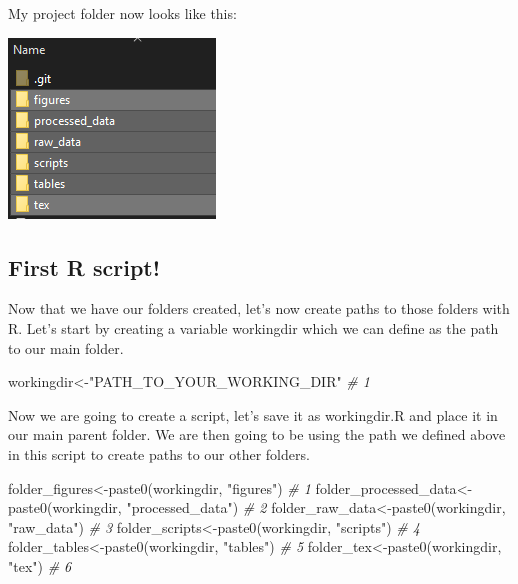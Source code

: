 \documentclass[
]{book}
\newenvironment{Shaded}{\begin{snugshade}}{\end{snugshade}}
\newcommand{\CommentTok}[1]{\textcolor[rgb]{0.56,0.35,0.01}{\textit{#1}}}
\newcommand{\FunctionTok}[1]{\textcolor[rgb]{0.00,0.00,0.00}{#1}}
\newcommand{\NormalTok}[1]{#1}
\newcommand{\OtherTok}[1]{\textcolor[rgb]{0.56,0.35,0.01}{#1}}
\newcommand{\StringTok}[1]{\textcolor[rgb]{0.31,0.60,0.02}{#1}}
\begin{document}
My project folder now looks like this:

\begin{center}\includegraphics[width=0.3\linewidth]{img/folders} \end{center}

\hypertarget{first-r-script}{%
\subsection{First R script!}\label{first-r-script}}

Now that we have our folders created, let's now create paths to those folders with R. Let's start by creating a variable workingdir which we can define as the path to our main folder.

\begin{Shaded}
\begin{Highlighting}[]
\NormalTok{workingdir}\OtherTok{\textless{}{-}}\StringTok{"PATH\_TO\_YOUR\_WORKING\_DIR"}  \CommentTok{\# 1}
\end{Highlighting}
\end{Shaded}

Now we are going to create a script, let's save it as workingdir.R and place it in our main parent folder. We are then going to be using the path we defined above in this script to create paths to our other folders.

\begin{Shaded}
\begin{Highlighting}[]
\NormalTok{folder\_figures}\OtherTok{\textless{}{-}}\FunctionTok{paste0}\NormalTok{(workingdir, }\StringTok{"figures"}\NormalTok{)                }\CommentTok{\# 1}
\NormalTok{folder\_processed\_data}\OtherTok{\textless{}{-}}\FunctionTok{paste0}\NormalTok{(workingdir, }\StringTok{"processed\_data"}\NormalTok{)  }\CommentTok{\# 2}
\NormalTok{folder\_raw\_data}\OtherTok{\textless{}{-}}\FunctionTok{paste0}\NormalTok{(workingdir, }\StringTok{"raw\_data"}\NormalTok{)              }\CommentTok{\# 3}
\NormalTok{folder\_scripts}\OtherTok{\textless{}{-}}\FunctionTok{paste0}\NormalTok{(workingdir, }\StringTok{"scripts"}\NormalTok{)                }\CommentTok{\# 4}
\NormalTok{folder\_tables}\OtherTok{\textless{}{-}}\FunctionTok{paste0}\NormalTok{(workingdir, }\StringTok{"tables"}\NormalTok{)                  }\CommentTok{\# 5}
\NormalTok{folder\_tex}\OtherTok{\textless{}{-}}\FunctionTok{paste0}\NormalTok{(workingdir, }\StringTok{"tex"}\NormalTok{)                        }\CommentTok{\# 6}
\end{Highlighting}
\end{Shaded}
\end{document}
